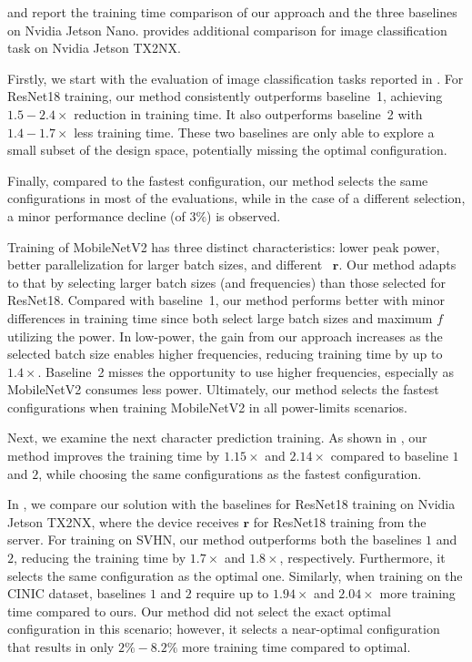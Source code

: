  and  report the training time comparison of our approach and the three baselines on Nvidia Jetson Nano.  provides additional comparison for image classification task on Nvidia Jetson TX2NX.

Firstly, we start with the evaluation of image classification tasks reported in . For ResNet18 training, our method consistently outperforms baseline~1, achieving~$1.5-2.4\times$ reduction in training time. It also outperforms baseline~2 with~$1.4-1.7\times$ less training time. These two baselines are only able to explore a small subset of the design space, potentially missing the optimal configuration. 

Finally, compared to the fastest configuration, our method selects the same configurations in most of the evaluations, while in the case of a different selection, a minor performance decline (of $3\%$) is observed. 

Training of MobileNetV2 has three distinct characteristics: lower peak power, better parallelization for larger batch sizes, and different ~$\mathbf{r}$. %
Our method adapts to that by selecting larger batch sizes (and frequencies) than those selected for ResNet18. Compared with baseline~1, our method performs better with minor differences in training time since both select large batch sizes and maximum $f$ utilizing the power.
In low-power, the gain from our approach increases as the selected batch size enables higher frequencies, reducing training time by up to~$1.4\times$. Baseline~2 misses the opportunity to use higher frequencies, especially as MobileNetV2 consumes less power. Ultimately, our method selects the fastest configurations when training MobileNetV2 in all power-limits scenarios.

Next, we examine the next character prediction training. As shown in , our method improves the training time by $1.15 \times$ and $2.14\times$ compared to baseline $1$ and $2$, while choosing the same configurations as the fastest configuration. 


In , we compare our solution with the baselines for ResNet18 training on Nvidia Jetson TX2NX, where the device receives $\mathbf{r}$ for ResNet18 training from the server. For training on SVHN, our method outperforms both the baselines $1$ and $2$, reducing the training time by $1.7\times$ and $1.8\times$, respectively. Furthermore, it selects the same configuration as the optimal one. Similarly, when training on the CINIC dataset, baselines $1$ and $2$ require up to $1.94\times$ and $2.04\times$ more training time compared to ours. Our method did not select the exact optimal configuration in this scenario; however, it selects a near-optimal configuration that results in only $2\%-8.2\%$ more training time compared to optimal.  

